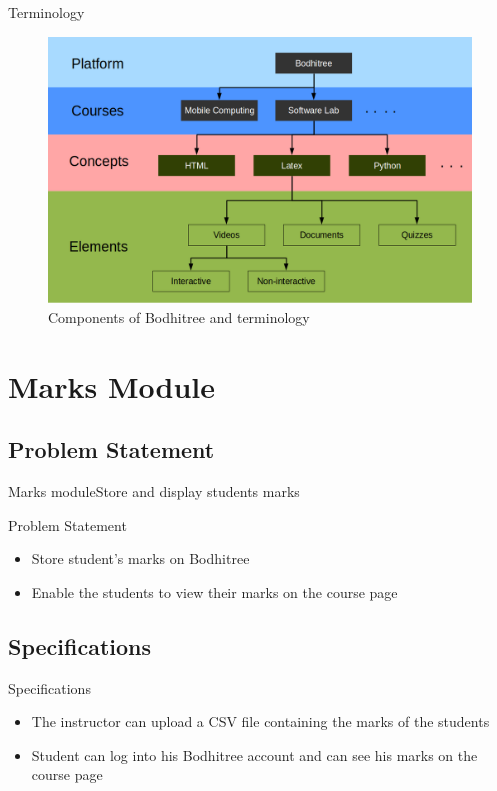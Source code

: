 \documentclass{beamer}
\begin{document}
\begin{frame}{Terminology}
	\begin{figure}
		\centering
		\includegraphics[width=0.8\linewidth]{media/bt}
		\caption{Components of Bodhitree and terminology}
		\label{fig:bt}
	\end{figure}

\end{frame}

\section{Marks Module}

\subsection{Problem Statement}

\begin{frame}{Marks module}{Store and display students marks}
\begin{block}{Problem Statement}
	\begin{itemize}
		\item Store student’s marks on Bodhitree
		\item Enable the students to view their marks on the course page
	\end{itemize}
\end{block}
\end{frame}

\subsection{Specifications}

\begin{frame}{Specifications}
	\begin{itemize}
		\item The instructor can upload a CSV file containing the marks of the students
		\item Student can log into his Bodhitree account and can see his marks on the course page
	\end{itemize}
\end{frame}
\end{document}
